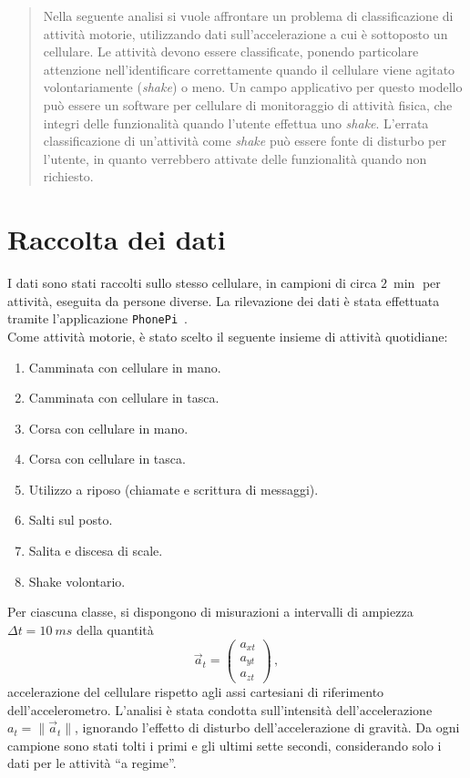 \documentclass[./main.tex]{subfiles}
\begin{document}
\begin{abstract}
\normalsize
Nella seguente analisi si vuole affrontare un problema di classificazione di attività motorie, utilizzando dati sull'accelerazione a cui è sottoposto un cellulare. Le attività devono essere classificate, ponendo particolare attenzione nell'identificare correttamente quando il cellulare viene agitato volontariamente ({\em shake}) o meno. Un campo applicativo per questo modello può essere un software per cellulare di monitoraggio di attività fisica, che integri delle funzionalità quando l'utente effettua uno {\em shake}. L'errata classificazione di un'attività come {\em shake} può essere fonte di disturbo per l'utente, in quanto verrebbero attivate delle funzionalità quando non richiesto.
\end{abstract}
\section{Raccolta dei dati}
I dati sono stati raccolti sullo stesso cellulare, in campioni di circa $\SI{2}{\min}$ per attività, eseguita da persone diverse. La rilevazione dei dati è stata effettuata tramite l'applicazione \texttt{PhonePi}~\cite{kumar2019}.\\
Come attività motorie, è stato scelto il seguente insieme di attività quotidiane:
\begin{enumerate}
	\item Camminata con cellulare in mano.
	\item Camminata con cellulare in tasca.
	\item Corsa con cellulare in mano.
	\item Corsa con cellulare in tasca.
	\item Utilizzo a riposo (chiamate e scrittura di messaggi).
	\item Salti sul posto.
	\item Salita e discesa di scale.
	\item Shake volontario.
\end{enumerate}
Per ciascuna classe, si dispongono di misurazioni a intervalli di ampiezza $\Delta t = \SI{10}{ms}$ della quantità
$$
\vec{a}_t = \begin{pmatrix}
a_{xt}\\
a_{yt}\\
a_{zt}
\end{pmatrix}\,,
$$
accelerazione del cellulare rispetto agli assi cartesiani di riferimento dell'accelerometro. L'analisi è stata condotta sull'intensità dell'accelerazione $a_t = \|\vec{a}_t\|$, ignorando l'effetto di disturbo dell'accelerazione di gravità. Da ogni campione sono stati tolti i primi e gli ultimi sette secondi, considerando solo i dati per le attività ``a regime''.
\end{document}
